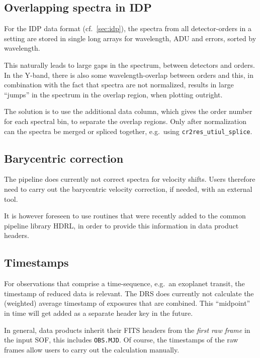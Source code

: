 \subsection{Overlapping spectra in IDP}

For the IDP data format (cf.~\ref{sec:idp}), the spectra from all
detector-orders in a setting are stored in single long arrays for wavelength,
ADU and errors, sorted by wavelength.

This naturally leads to large gaps in the spectrum, between detectors and
orders. In the Y-band, there is also some wavelength-overlap between orders and
this, in combination with the fact that spectra are not normalized, results in
large ``jumps'' in the spectrum in the overlap region, when plotting outright.

The solution is to use the additional data column, which gives the order number
for each spectral bin, to separate the overlap regions. Only after normalization
can the spectra be merged or spliced together, e.g.~using
\verb!cr2res_utiul_splice!.

\subsection{Barycentric correction}

The pipeline does currently not correct spectra for velocity shifts. Users
therefore need to carry out the barycentric velocity correction, if needed, with
an external tool.

It is however foreseen to use routines that were recently added to the
common pipeline library HDRL, in order to provide this information in 
data product headers.

\subsection{Timestamps}
For observations that comprise a time-sequence, e.g.~an exoplanet transit,
the timestamp of reduced data is relevant. The DRS does currently not 
calculate the (weighted) average timestamp of exposures that are combined. This ``midpoint'' in time will get added as a separate header key in the future.

In general, data products inherit their FITS headers from the \emph{first raw frame} in the input SOF, this includes \texttt{OBS.MJD}. Of course, the timestamps of the raw frames allow users to carry out the calculation manually.
